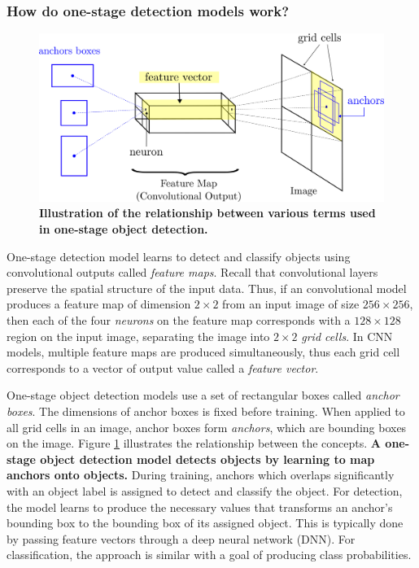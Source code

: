 \documentclass[12pt,a4paper,twoside,openany]{report}
\begin{document}
\subsubsection{How do one-stage detection models work?} \label{section:one_stage}
\begin{figure}[H]
    \centering
    \includegraphics{figs/prep/anchor_box.png}
    \caption{\textbf{Illustration of the relationship between various terms used in one-stage object detection.}}
    \label{fig:explain_anchors}
\end{figure}

One-stage detection model learns to detect and classify objects using convolutional outputs called \textit{feature maps}. Recall that convolutional layers preserve the spatial structure of the input data. Thus, if an convolutional model produces a feature map of dimension $2 \times 2$ from an input image of size $256 \times 256$, then each of the four \textit{neurons} on the feature map corresponds with a $128 \times 128$ region on the input image, separating the image into $2 \times 2$ \textit{grid cells}.
In CNN models, multiple feature maps are produced simultaneously, thus each grid cell corresponds to a vector of output value called a \textit{feature vector}.

One-stage object detection models use a set of rectangular boxes called \textit{anchor boxes}. The dimensions of anchor boxes is fixed before training. When applied to all grid cells in an image, anchor boxes form \textit{anchors}, which are bounding boxes on the image. Figure \ref{fig:explain_anchors} illustrates the relationship between  the concepts. \textbf{A one-stage object detection model detects objects by learning to map anchors onto objects.} During training, anchors which overlaps significantly with an object label is assigned to detect and classify the object. For detection, the model learns to produce the necessary values that transforms an anchor's bounding box to the bounding box of its assigned object. This is typically done by passing feature vectors through a deep neural network (DNN). For classification, the approach is similar with a goal of producing class probabilities.
\end{document}

